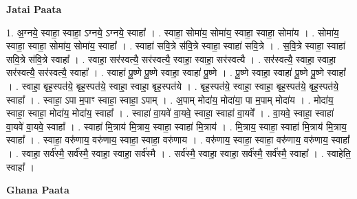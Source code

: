 \documentclass[17pt]{extarticle}
\begin{document}
\textbf{Jatai Paata} \newline

1. अ॒ग्नये॒ स्वाहा॒ स्वाहा॒ ऽग्नये॒ ऽग्नये॒ स्वाहा᳚ । . स्वाहा॒ सोमा॑य॒ सोमा॑य॒ स्वाहा॒ स्वाहा॒ सोमा॑य । . सोमा॑य॒ स्वाहा॒ स्वाहा॒ सोमा॑य॒ सोमा॑य॒ स्वाहा᳚ । . स्वाहा॑ सवि॒त्रे स॑वि॒त्रे स्वाहा॒ स्वाहा॑ सवि॒त्रे । . स॒वि॒त्रे स्वाहा॒ स्वाहा॑ सवि॒त्रे स॑वि॒त्रे स्वाहा᳚ । . स्वाहा॒ सर॑स्वत्यै॒ सर॑स्वत्यै॒ स्वाहा॒ स्वाहा॒ सर॑स्वत्यै । . सर॑स्वत्यै॒ स्वाहा॒ स्वाहा॒ सर॑स्वत्यै॒ सर॑स्वत्यै॒ स्वाहा᳚ । . स्वाहा॑ पू॒ष्णे पू॒ष्णे स्वाहा॒ स्वाहा॑ पू॒ष्णे । . पू॒ष्णे स्वाहा॒ स्वाहा॑ पू॒ष्णे पू॒ष्णे स्वाहा᳚ । . स्वाहा॒ बृह॒स्पत॑ये॒ बृह॒स्पत॑ये॒ स्वाहा॒ स्वाहा॒ बृह॒स्पत॑ये । . बृह॒स्पत॑ये॒ स्वाहा॒ स्वाहा॒ बृह॒स्पत॑ये॒ बृह॒स्पत॑ये॒ स्वाहा᳚ । . स्वाहा॒ ऽपा म॒पाꣳ स्वाहा॒ स्वाहा॒ ऽपाम् । . अ॒पाम् मोदा॑य॒ मोदा॑या॒ पा म॒पाम् मोदा॑य । . मोदा॑य॒ स्वाहा॒ स्वाहा॒ मोदा॑य॒ मोदा॑य॒ स्वाहा᳚ । . स्वाहा॑ वा॒यवे॑ वा॒यवे॒ स्वाहा॒ स्वाहा॑ वा॒यवे᳚ । . वा॒यवे॒ स्वाहा॒ स्वाहा॑ वा॒यवे॑ वा॒यवे॒ स्वाहा᳚ । . स्वाहा॑ मि॒त्राय॑ मि॒त्राय॒ स्वाहा॒ स्वाहा॑ मि॒त्राय॑ । . मि॒त्राय॒ स्वाहा॒ स्वाहा॑ मि॒त्राय॑ मि॒त्राय॒ स्वाहा᳚ । . स्वाहा॒ वरु॑णाय॒ वरु॑णाय॒ स्वाहा॒ स्वाहा॒ वरु॑णाय । . वरु॑णाय॒ स्वाहा॒ स्वाहा॒ वरु॑णाय॒ वरु॑णाय॒ स्वाहा᳚ । . स्वाहा॒ सर्व॑स्मै॒ सर्व॑स्मै॒ स्वाहा॒ स्वाहा॒ सर्व॑स्मै । . सर्व॑स्मै॒ स्वाहा॒ स्वाहा॒ सर्व॑स्मै॒ सर्व॑स्मै॒ स्वाहा᳚ । . स्वाहेति॒ स्वाहा᳚ । \newline

\textbf{Ghana Paata } \newline
\end{document}
